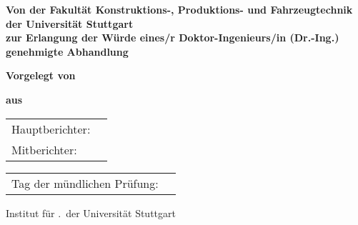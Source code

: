 \ifpublishing
\begin{titlepage}
	\setcounter{page}{3} %
	\centering
	\large %
	
	
	\begin{Large}
		\textbf{\Titel}
	\end{Large}
	
	\vspace{1.5\baselineskip}
	
	\textbf{Von der Fakultät Konstruktions-, Produktions- und Fahrzeugtechnik\\der Universität Stuttgart\\zur Erlangung der Würde eines/r Doktor-Ingenieurs/in (Dr.-Ing.)\\genehmigte Abhandlung}
	
	\vspace{2.5\baselineskip}
	
	\textbf{Vorgelegt von}
	
	\vspace{0.6\baselineskip}
	
	\textbf{\Autor}

	\vspace{0.05\baselineskip}
	\textbf{aus \Geburtsort}
	

	\vspace{2.5\baselineskip}
	\begin{table}[H]
		\large
		\begin{tabular}{ll}
			\quad Hauptberichter: & \protect\Hauptberichter\\
			\quad Mitberichter: & \protect\Mitberichter\\
		\end{tabular}
	\end{table}
	\vspace{0.10\baselineskip}
	\begin{table}[H]
		\large
		\begin{tabular}{ll}
			\quad Tag der mündlichen Prüfung:  & \protect\Pruefungsdatum\\
		\end{tabular}
	\end{table}
	
	\vfill
	
	\begin{center}
		Institut für \Institut.\ der Universität Stuttgart
	\end{center}
		
	\Jahr	
\end{titlepage}

